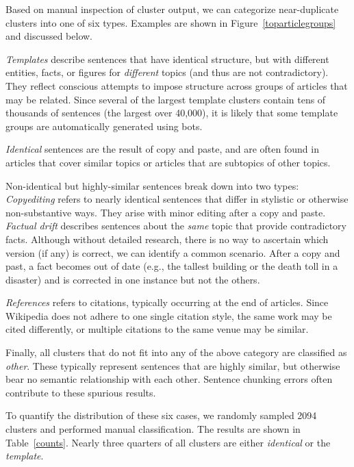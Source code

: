 \documentclass[letterpaper]{article}
\begin{document}
Based on manual inspection of cluster output, we can categorize
near-duplicate clusters into one of six types. Examples are shown in
Figure~\ref{toparticlegroups} %
and discussed below.

\emph{Templates} describe sentences that have identical structure, but
with different entities, facts, or figures for {\it different} topics
(and thus are not contradictory). They reflect conscious attempts to
impose structure across groups of articles that may be related. Since
several of the largest template clusters contain tens of thousands of
sentences (the largest over 40,000), it is likely that some
template groups are automatically generated using bots.

\emph{Identical} sentences are the result of copy and paste, and are
often found in articles that cover similar topics or articles that are
subtopics of other topics.

Non-identical but highly-similar sentences break down into two types:
\emph{Copyediting} refers to nearly identical sentences that differ in
stylistic or otherwise non-substantive ways. They arise with minor
editing after a copy and paste. \emph{Factual drift} describes
sentences about the {\it same} topic that provide contradictory
facts. Although without detailed research, there is no way to
ascertain which version (if any) is correct, we can identify a common
scenario. After a copy and past, a fact becomes out of date (e.g., the
tallest building or the death toll in a disaster) and is corrected in
one instance but not the others.

\emph{References} refers to citations, typically occurring at the end
of articles. Since Wikipedia does not adhere to one single citation
style, the same work may be cited differently, or multiple citations
to the same venue may be similar.

Finally, all clusters that do not fit into any of the above category
are classified as \emph{other}. These typically represent sentences
that are highly similar, but otherwise bear no semantic relationship
with each other. Sentence chunking errors often contribute to these
spurious results.


To quantify the distribution of these six cases, we randomly sampled
2094 clusters and performed manual classification. The results are
shown in Table~\ref{counts}. Nearly three quarters of all clusters
are either \emph{identical} or the \emph{template}.
\end{document}
